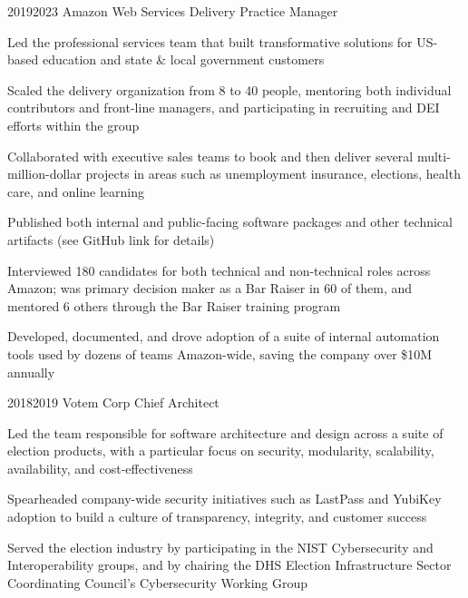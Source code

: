 \job
  {2019}{2023}
  {Amazon Web Services}
  {Delivery Practice Manager}
  {\begin{achievements}
    \item Led the professional services team that built transformative solutions for US-based education and state \& local government customers
    \item Scaled the delivery organization from 8 to 40 people, mentoring both individual contributors and front-line managers, and participating in recruiting and DEI efforts within the group
    \item Collaborated with executive sales teams to book and then deliver several multi-million-dollar projects in areas such as unemployment insurance, elections, health care, and online learning
    \item Published both internal and public-facing software packages and other technical artifacts (see GitHub link for details)
    \item Interviewed 180 candidates for both technical and non-technical roles across Amazon; was primary decision maker as a Bar Raiser in 60 of them, and mentored 6 others through the Bar Raiser training program
    \item Developed, documented, and drove adoption of a suite of internal automation tools used by dozens of teams Amazon-wide, saving the company over \$10M annually
  \end{achievements}}

\job
  {2018}{2019}
  {Votem Corp}
  {Chief Architect}
  {\begin{achievements}
    \item Led the team responsible for software architecture and design across a suite of election products, with a particular focus on security, modularity, scalability, availability, and cost-effectiveness
    \item Spearheaded company-wide security initiatives such as LastPass and YubiKey adoption to build a culture of transparency, integrity, and customer success
    \item Served the election industry by participating in the NIST Cybersecurity and Interoperability groups, and by chairing the DHS Election Infrastructure Sector Coordinating Council's Cybersecurity Working Group
  \end{achievements}}

\pagebreak

